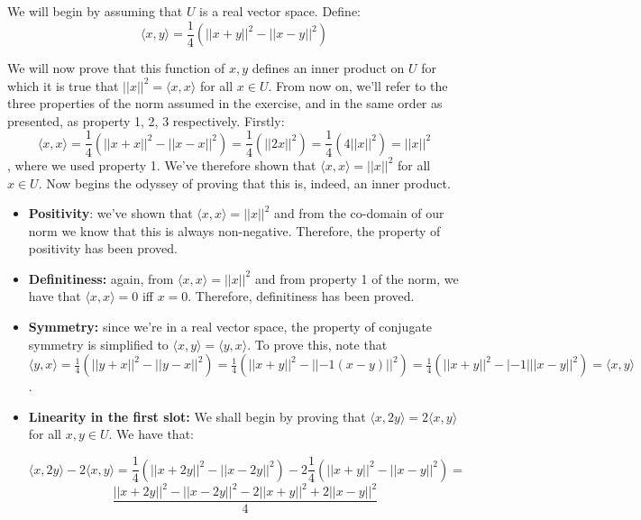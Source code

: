 \begin{solution}

We will begin by assuming that $U$ is a real vector space. Define:
$$\langle x, y \rangle = \frac{1}{4}(\lvert \lvert x + y \rvert \rvert^2 - \lvert \lvert x - y \rvert \rvert^2)$$

We will now prove that this function of $x, y$ defines an inner product on $U$ for which it is true that $\lvert \lvert x \rvert \rvert^2 = \langle x, x \rangle$ for all $x \in U$. From now on, we'll refer to the three properties of the norm assumed in the exercise, and in the same order as presented, as property 1, 2, 3 respectively.
Firstly:
$$\langle x, x \rangle = \frac{1}{4}(\lvert \lvert x + x \rvert \rvert^2 - \lvert \lvert x - x \rvert \rvert^2) = \frac{1}{4}(\lvert \lvert 2x \rvert \rvert^2) = \frac{1}{4}(4\lvert \lvert x \rvert \rvert^2) = \lvert \lvert x \rvert \rvert^2$$
, where we used property 1. We've therefore shown that $\langle x, x \rangle = \lvert \lvert x \rvert \rvert^2$ for all $x \in U$. Now begins the odyssey of proving that this is, indeed, an inner product.
\begin{itemize}
    \item \textbf{Positivity}: we've shown that $\langle x, x \rangle = \lvert \lvert x \rvert \rvert^2$ and from the co-domain of our norm we know that this is always non-negative. Therefore, the property of positivity has been proved.
    \item \textbf{Definitiness:} again, from $\langle x, x \rangle = \lvert \lvert x \rvert \rvert^2$ and from property 1 of the norm, we have that $\langle x, x \rangle = 0$ iff $x = 0$. Therefore, definitiness has been proved.
    \item \textbf{Symmetry:} since we're in a real vector space, the property of conjugate symmetry is simplified to $\langle x, y \rangle = \langle y, x \rangle$. To prove this, note that $\langle y, x \rangle = \frac{1}{4}(\lvert \lvert y + x \rvert \rvert^2 - \lvert \lvert y -x \rvert \rvert^2) = \frac{1}{4}(\lvert \lvert x + y \rvert \rvert^2 - \lvert \lvert -1(x - y) \rvert \rvert^2) = \frac{1}{4}(\lvert \lvert x + y \rvert \rvert^2 - \lvert -1 \rvert \lvert \lvert x - y \rvert \rvert^2) = \langle x, y \rangle$.
    \item \textbf{Linearity in the first slot:} We shall begin by proving that $\langle x, 2y \rangle = 2\langle x, y \rangle$ for all $x, y \in U$. We have that:

    $$\langle x, 2y \rangle - 2\langle x, y \rangle = \frac{1}{4}(\lvert \lvert x + 2y \rvert \rvert^2 - \lvert \lvert x - 2y \rvert \rvert^2) - 2\frac{1}{4}(\lvert \lvert x + y \rvert \rvert^2 - \lvert \lvert x - y \rvert \rvert^2) = $$
    $$\frac{\lvert \lvert x + 2y \rvert \rvert^2 - \lvert \lvert x - 2y \rvert \rvert^2 - 2\lvert \lvert x + y\rvert \rvert^2 + 2\lvert \lvert x - y \rvert \rvert^2}{4}$$


\end{itemize}
\end{solution}
